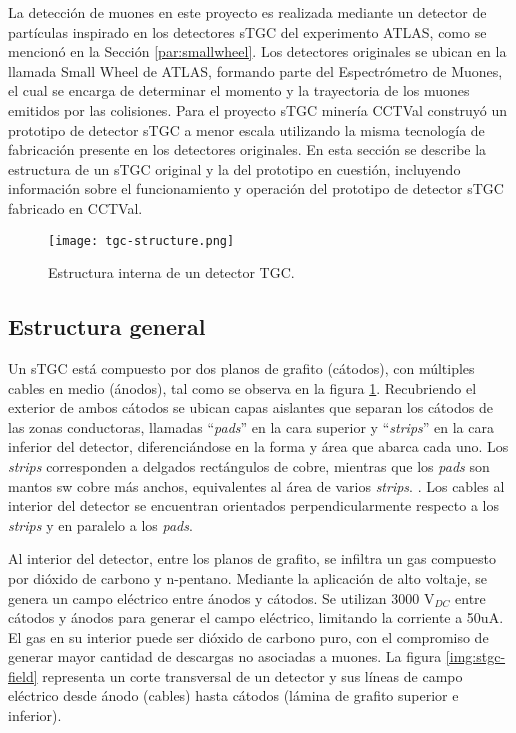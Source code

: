 
La detección de muones en este proyecto es realizada mediante un detector de partículas inspirado en los detectores sTGC del experimento ATLAS, como se mencionó en la Sección  \ref{par:smallwheel}. Los detectores originales se ubican en la llamada Small Wheel de ATLAS, formando parte del Espectrómetro de Muones, el cual se encarga de determinar el momento y la trayectoria de los muones emitidos por las colisiones. Para el proyecto sTGC minería CCTVal construyó  un prototipo de detector sTGC a menor escala utilizando la misma tecnología de fabricación presente en los detectores originales. En esta sección se describe la estructura de un sTGC original y la del prototipo en cuestión, incluyendo información sobre el funcionamiento y operación del prototipo de detector sTGC fabricado en CCTVal.

\begin{figure}[h]
	\centering
	\texttt{[image: tgc-structure.png]}
	\caption{Estructura interna de un detector TGC\cite{Chapman2014ATLASUpgrade}.}
	\label{img:stgc-structure}
\end{figure}

\subsection{Estructura general}  

	Un sTGC está compuesto por dos planos de grafito (cátodos), con múltiples cables en medio (ánodos)\cite{Formenti2018CERNReport}, tal como se observa en la figura \ref{img:stgc-structure}. Recubriendo el exterior de ambos cátodos se ubican capas aislantes que separan los cátodos de las zonas conductoras, llamadas ``\textit{pads}'' en la cara superior y ``\textit{strips}'' en la cara inferior del detector, diferenciándose en la forma y área que abarca cada uno. Los \textit{strips} corresponden a delgados rectángulos de cobre, mientras que los \textit{pads} son mantos sw cobre más anchos, equivalentes al área de varios \textit{strips}. . Los cables al interior del detector se encuentran orientados perpendicularmente respecto a los \textit{strips} y en paralelo a los \textit{pads}.
	
	Al interior del detector, entre los planos de grafito, se infiltra un gas compuesto por dióxido de carbono y n-pentano\cite{Formenti2018CERNReport}. Mediante la aplicación de alto voltaje, se genera un campo eléctrico entre ánodos y cátodos. Se utilizan 3000 V$_{DC}$ entre cátodos y ánodos para generar el campo eléctrico, limitando la corriente a 50uA. El gas en su interior puede ser dióxido de carbono puro, con el compromiso de generar mayor cantidad de descargas no asociadas a muones. La figura \ref{img:stgc-field} representa un corte transversal de un detector y sus líneas de campo eléctrico desde ánodo (cables) hasta cátodos (lámina de grafito superior e inferior). 
	
